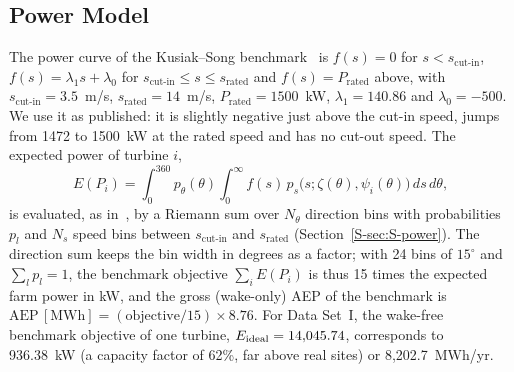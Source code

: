 \subsection{Power Model}
\label{sec:powermodel}
The power curve of the Kusiak--Song benchmark~\cite{Kusiak2010} is $f(s)=0$ for $s<s_{\text{cut-in}}$, $f(s)=\lambda_1 s+\lambda_0$ for $s_{\text{cut-in}}\le s\le s_{\text{rated}}$ and $f(s)=P_{\text{rated}}$ above, with $s_{\text{cut-in}}=3.5$~m/s, $s_{\text{rated}}=14$~m/s, $P_{\text{rated}}=1500$~kW, $\lambda_1=140.86$ and $\lambda_0=-500$. We use it as published: it is slightly negative just above the cut-in speed, jumps from 1472 to 1500~kW at the rated speed and has no cut-out speed. The expected power of turbine $i$,
\begin{equation}\label{eq8}
E(P_i) = \int_0^{360} p_\theta(\theta) \int_0^{\infty} f(s)\,
       p_s\bigl(s; \zeta(\theta), \psi_i(\theta)\bigr) \, ds \, d\theta ,
\end{equation}
is evaluated, as in~\cite{Kusiak2010}, by a Riemann sum over $N_\theta$ direction bins with probabilities $p_l$ and $N_s$ speed bins between $s_{\text{cut-in}}$ and $s_{\text{rated}}$ (Section~\ref{S-sec:S-power}). The direction sum keeps the bin width in degrees as a factor; with 24 bins of $15^\circ$ and $\sum_l p_l=1$, the benchmark objective $\sum_i E(P_i)$ is thus 15 times the expected farm power in kW, and the gross (wake-only) AEP of the benchmark is $\mathrm{AEP}\,[\mathrm{MWh}] = (\text{objective}/15)\times 8.76$. For Data Set~I, the wake-free benchmark objective of one turbine, $E_{\rm ideal}=14{,}045.74$, corresponds to 936.38~kW (a capacity factor of 62\%, far above real sites) or 8,202.7~MWh/yr.

